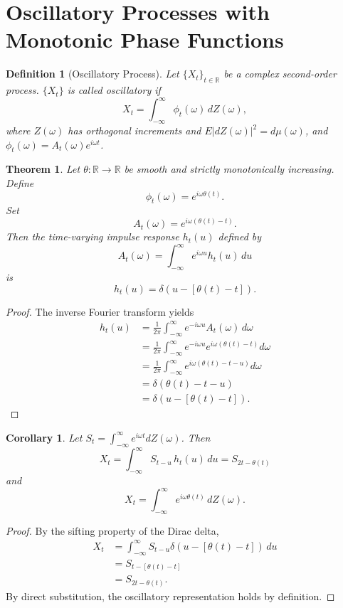 \documentclass{article}
\newtheorem{definition}{Definition}
\newtheorem{theorem}{Theorem}
\newtheorem{corollary}{Corollary}
\begin{document}
\section*{Oscillatory Processes with Monotonic Phase Functions}

\begin{definition}[Oscillatory Process]
Let $\{X_t\}_{t\in\mathbb{R}}$ be a complex second-order process. $\{X_t\}$ is called oscillatory if
\[
X_t = \int_{-\infty}^\infty \phi_t(\omega)\,dZ(\omega),
\]
where $Z(\omega)$ has orthogonal increments and $E|dZ(\omega)|^2 = d\mu(\omega)$, and $\phi_t(\omega) = A_t(\omega) e^{i\omega t}$.
\end{definition}

\begin{theorem}
Let $\theta:\mathbb{R}\to\mathbb{R}$ be smooth and strictly monotonically increasing. Define
\[
\phi_t(\omega) = e^{i\omega\theta(t)} .
\]
Set
\[
A_t(\omega) = e^{i\omega(\theta(t)-t)} .
\]
Then the time-varying impulse response $h_t(u)$ defined by
\[
A_t(\omega) = \int_{-\infty}^\infty e^{i\omega u} h_t(u)\,du
\]
is
\[
h_t(u) = \delta(u - [\theta(t) - t]) .
\]
\end{theorem}

\begin{proof}
The inverse Fourier transform yields
\begin{align*}
h_t(u) &= \frac{1}{2\pi}\int_{-\infty}^\infty e^{-i\omega u}A_t(\omega)\,d\omega \\
       &= \frac{1}{2\pi}\int_{-\infty}^\infty e^{-i\omega u} e^{i\omega(\theta(t)-t)} d\omega \\
       &= \frac{1}{2\pi}\int_{-\infty}^\infty e^{i\omega(\theta(t)-t-u)}d\omega \\
       &= \delta(\theta(t)-t-u) \\
       &= \delta(u - [\theta(t)-t]) .
\end{align*}
\end{proof}

\begin{corollary}
Let $S_t = \int_{-\infty}^{\infty} e^{i\omega t} dZ(\omega)$. Then
\[
X_t = \int_{-\infty}^\infty S_{t-u}\,h_t(u)\,du = S_{2t - \theta(t)}
\]
and
\[
X_t = \int_{-\infty}^\infty e^{i\omega\theta(t)}\,dZ(\omega) .
\]
\end{corollary}

\begin{proof}
By the sifting property of the Dirac delta,
\begin{align*}
X_t &= \int_{-\infty}^\infty S_{t-u} \delta(u - [\theta(t)-t])\,du \\
    &= S_{t - [\theta(t)-t]} \\
    &= S_{2t - \theta(t)} .
\end{align*}
By direct substitution, the oscillatory representation holds by definition.
\end{proof}
\end{document}
